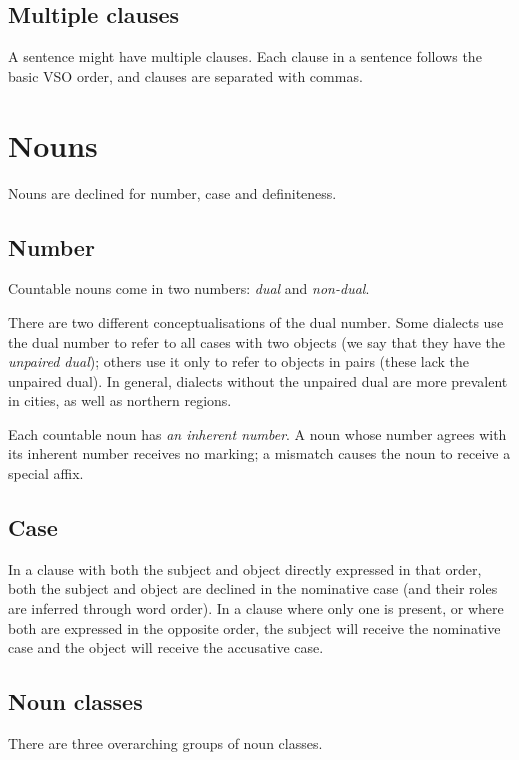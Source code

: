 \documentclass{book}
\begin{document}
\section{Multiple clauses}

A sentence might have multiple clauses. Each clause in a sentence follows the basic VSO order, and clauses are separated with commas.

\chapter{Nouns}

Nouns are declined for number, case and definiteness.

\section{Number}

Countable nouns come in two numbers: \emph{dual} and \emph{non-dual}.

There are two different conceptualisations of the dual number. Some dialects use the dual number to refer to all cases with two objects (we say that they have the \emph{unpaired dual}); others use it only to refer to objects in pairs (these lack the unpaired dual). In general, dialects without the unpaired dual are more prevalent in cities, as well as northern regions.

Each countable noun has \emph{an inherent number}. A noun whose number agrees with its inherent number receives no marking; a mismatch causes the noun to receive a special affix.

\section{Case}

In a clause with both the subject and object directly expressed in that order, both the subject and object are declined in the nominative case (and their roles are inferred through word order). In a clause where only one is present, or where both are expressed in the opposite order, the subject will receive the nominative case and the object will receive the accusative case.

\section{Noun classes}

There are three overarching groups of noun classes.
\end{document}
